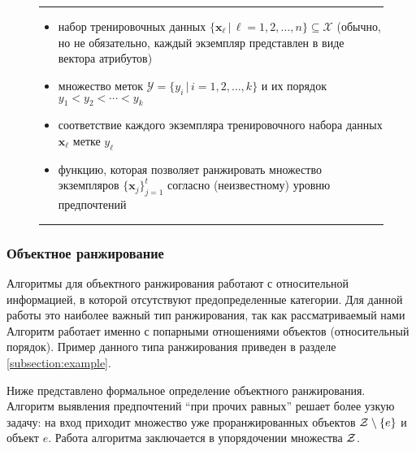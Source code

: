 	\begin{figure}[h!]
		\hrule
		\begin{description}[nosep]
			\item[Дано:] \null\leavevmode
			\begin{itemize}[itemsep=0pt,leftmargin=2ex,label=\textbf{---}]
				\item набор тренировочных данных $\{\bm{x}_\ell \, | \, \ell = 1,2,\dots,n\} \subseteq \mathcal{X} $ (обычно, но не обязательно, каждый экземпляр представлен в виде вектора атрибутов)
				\item множество меток $\mathcal{Y} = \{y_i\,|\,i = 1,2,\dotsc,k\}$ и их порядок $y_1 < y_2 < \dotsb < y_k$ 
				\item соответствие каждого экземпляра тренировочного набора данных $\bm{x}_\ell$ метке $y_\ell$
			\end{itemize}
			\item[Найти:] \null\leavevmode
			\begin{itemize}[itemsep=0pt,leftmargin=2ex,label=\textbf{---}]
				\item функцию, которая позволяет ранжировать множество экземпляров $\{\bm{x}_j\}^t_{j=1}$ согласно (неизвестному) уровню предпочтений
			\end{itemize}
		\end{description} 
		\hrule
		\label{fig:instance_ranking}
	\end{figure}
	
	\subsubsection{Объектное ранжирование}
	Алгоритмы для объектного ранжирования работают с 
	относительной %
	информацией, в которой отсутствуют предопределенные категории. Для данной работы это наиболее важный тип ранжирования, так как рассматриваемый нами Алгоритм работает именно с попарными отношениями объектов (относительный порядок). Пример данного типа ранжирования приведен в разделе \ref{subsection:example}.
	
	Ниже представлено формальное определение объектного ранжирования. Алгоритм выявления предпочтений \enquote{при прочих равных} решает более узкую задачу: на вход приходит множество уже проранжированных объектов $\mathcal{Z} \setminus \{e\}$ и объект $e$. Работа алгоритма заключается в упорядочении множества $\mathcal{Z}$.
	
